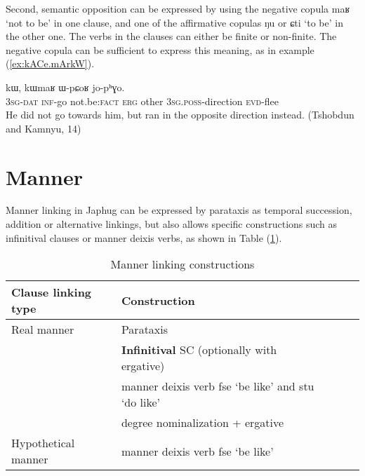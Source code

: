 \documentclass[oldfontcommands,oneside,a4paper,11pt]{article}
\newcommand{\ipa}[1]{{\phon \mbox{#1}}} %
\newcommand{\refb}[1]{(\ref{#1})}
\begin{document}
Second, semantic opposition can be expressed by using the negative copula \ipa{maʁ} `not to be' in one clause, and one of the affirmative copulas \ipa{ŋu} or \ipa{ɕti} `to be' in the other one. The verbs in the clauses can either be finite or non-finite. The negative copula can be sufficient to express this meaning, as in example \refb{ex:kACe.mArkW}.

\begin{exe}
\ex \label{ex:kACe.mArkW}
\gll
[\ipa{ɯ-ɕki}  	\ipa{kɤ-ɕe}]  	\ipa{maʁ}  	\ipa{kɯ,}  	\ipa{kɯmaʁ}  	\ipa{ɯ-pɕoʁ}  	\ipa{jo-pʰɣo.}  \\
\textsc{3sg-dat} \textsc{inf}-go not.be:\textsc{fact} \textsc{erg} other \textsc{3sg.poss}-direction \textsc{evd}-flee \\
 \glt He did not go towards him, but ran in the opposite direction instead. (Tshobdun and Kamnyu, 14)
\end{exe}
 

%
% 
	 
	 

\section{Manner} \label{sec:manner}

Manner linking in Japhug can be expressed by parataxis as temporal succession, addition or alternative linkings, but also allows specific constructions such as infinitival clauses or manner deixis verbs, as shown in Table \refb{tab:manner}.

\begin{table}[h]
\caption{Manner linking constructions} \label{tab:manner}
\begin{tabular}{lllll}
\toprule
 Clause linking type &Construction \\
\midrule
Real manner & Parataxis \\
& \textbf{Infinitival} SC (optionally with ergative)\\
& manner deixis   verb \ipa{fse} `be like' and \ipa{stu} `do like' \\
& degree nominalization + ergative \\
\midrule
Hypothetical manner & manner deixis   verb \ipa{fse} `be like'   \\
\bottomrule
\end{tabular}
\end{table}
 
\end{document}
